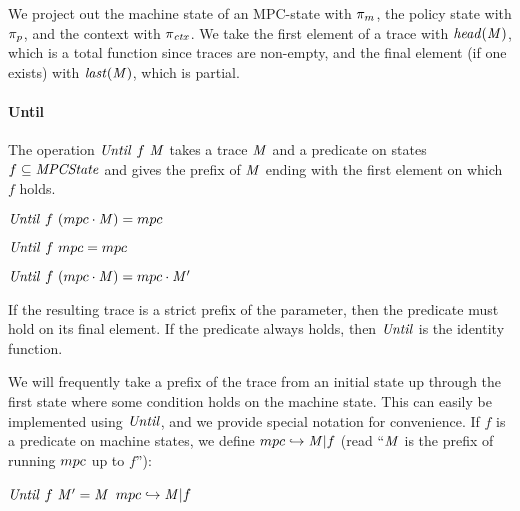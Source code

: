 \documentclass[acmsmall,review,anonymous]{acmart}\settopmatter{printfolios=true,printccs=false,printacmref=false}
\begin{document}
{We project out the machine state of an MPC-state with \(\pi_m\), the
policy state with \(\pi_p\), and the context with \(\pi_{\mathit{ctx}}\).
We take the first element of a trace with \(\mathit{head}(\mathit{M})\), which is a total
function since traces are non-empty, and the final element (if one exists) with
\(\mathit{last}(\mathit{M})\), which is partial.

\paragraph*{Until}
The operation \(\mathit{Until} ~ f ~ \mathit{M}\) takes a trace \(\mathit{M}\)
and a predicate on states \(f \subseteq \mathit{MPCState}\) and gives the prefix of
\(\mathit{M}\) ending with the first element on which \(f\) holds.

\begin{center}
  \begin{minipage}{.3\textwidth}
             {\(\mathit{Until} ~ f ~ (mpc \cdot \mathit{M}) = mpc\)}
  \end{minipage}
%
  \begin{minipage}{.3\textwidth}
    \judgment{}
             {\(\mathit{Until} ~ f ~ mpc = mpc\)}
%
  \end{minipage}
  \begin{minipage}{.3\textwidth}
                {\(\mathit{Until} ~ f ~ (mpc \cdot \mathit{M}) = mpc \cdot \mathit{M}'\)}
  \end{minipage}
\end{center}
%
If the resulting trace is a strict prefix of the parameter, then the
predicate must hold on its final element. If the predicate always holds, then
\(\mathit{Until}\) is the identity function.

We will frequently take a prefix of the trace from an initial state up
through the first state where some condition holds on the machine state.
This can easily be implemented using \(\mathit{Until}\), and we provide special notation
for convenience.
%
If \(f\) is a predicate on machine states, we define \(mpc
\hookrightarrow \mathit{M} | f\) (read ``\(\mathit{M}\) is the prefix of
running \(mpc\) up to \(f\)''):
%
\begin{center}
            {\(\mathit{Until} ~ f ~ \mathit{M}' = \mathit{M}\)}
            {\(mpc \hookrightarrow \mathit{M} | f\)}
\end{center}

}
\end{document}
